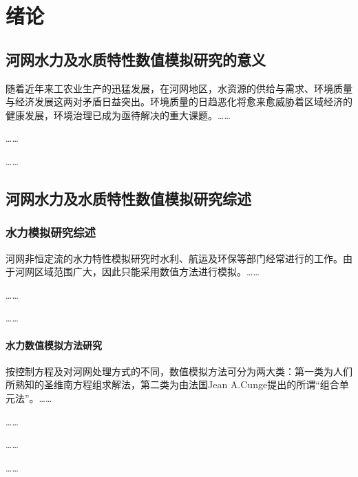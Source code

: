 \chapter{绪论}
\label{chap:introduction}
\section{河网水力及水质特性数值模拟研究的意义}
\label{sec:meaning}

随着近年来工农业生产的迅猛发展，在河网地区，水资源的供给与需求、环境质量与经济发展这两对矛盾日益突出\cite{tongjiju1997}。环境质量的日趋恶化将愈来愈威胁着区域经济的健康发展，环境治理已成为亟待解决的重大课题\cite{zhengxiaoyu1994}。……\par
……\par
……\par

\section{河网水力及水质特性数值模拟研究综述}

\subsection{水力模拟研究综述}
河网非恒定流的水力特性模拟研究时水利、航运及环保等部门经常进行的工作\cite{liyitian1997}。由于河网区域范围广大，因此只能采用数值方法进行模拟。……\par
……\par
……

\subsubsection{水力数值模拟方法研究}
按控制方程及对河网处理方式的不同，数值模拟方法可分为两大类：第一类为人们所熟知的圣维南方程组求解法，第二类为由法国Jean A.Cunge提出的所谓“组合单元法”\cite{halts1996}。……\par
……\par
……\par
……

